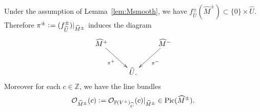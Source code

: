 \documentclass[11pt]{amsart}
\theoremstyle{plain}
\newcommand{\oO}{\mathcal{O}}
\newcommand{\Pic}{\mathop{\rm Pic}\nolimits}
\begin{document}
Under the assumption of Lemma~\ref{lem:Msmooth}, 
we have
 $f_{\widehat{U}}^{\pm}(\widehat{M}^{\pm}) \subset \{0\} \times \widehat{U}$. 
Therefore 
$\pi^{\pm} \cneq (f^{\pm}_{\widehat{U}})|_{\widehat{M}^{\pm}}$
induces the diagram
\begin{align}\label{dia:pi0}
\xymatrix{
\widehat{M}^{+} \ar[rd]_-{\pi^+} & & \widehat{M}^{-} \ar[ld]^-{\pi^-} \\
& \widehat{U}. &
}
\end{align}
Moreover for each $c \in \mathbb{Z}$, 
we have the line bundles
\begin{align*}
\oO_{\widehat{M}^{\pm}}(c) \cneq 
\oO_{\mathbb{P}(V^{\pm})_{\widehat{U}}}(c)|_{\widehat{M}^{\pm}}
\in \Pic(\widehat{M}^{\pm}). 
\end{align*}
\end{document}
